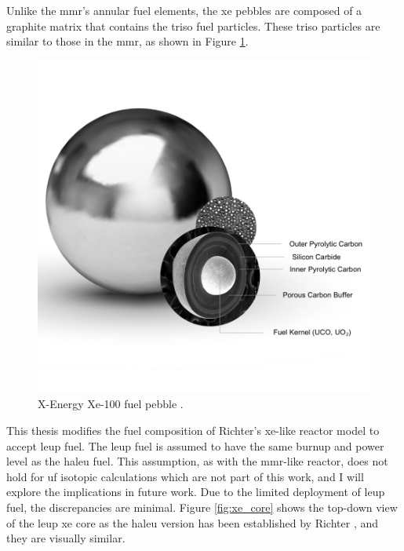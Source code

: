Unlike the \gls{mmr}'s annular fuel elements, the \gls{xe} pebbles are composed of a graphite matrix that contains the \gls{triso} fuel particles. These \gls{triso} particles are similar to those in the \gls{mmr}, as shown in Figure \ref{fig:xe_fuel}.

\begin{figure}[H]
    \centering
    \includegraphics[scale=0.28]{images/reactor_design/graphic-triso-x-pebble.jpg}
    \caption{X-Energy Xe-100 fuel pebble \cite{xe_fuel}.}
    \label{fig:xe_fuel}
\end{figure}


This thesis modifies the fuel composition of Richter's \gls{xe}-like reactor model to accept \gls{leup} fuel. The \gls{leup} fuel is assumed to have the same burnup and power level as the \gls{haleu} fuel. This assumption, as with the \gls{mmr}-like reactor, does not hold for \gls{uf} isotopic calculations which are not part of this work, and I will explore the implications in future work. Due to the limited deployment of \gls{leup} fuel, the discrepancies are minimal. Figure \ref{fig:xe_core} shows the top-down view of the \gls{leup} \gls{xe} core as the \gls{haleu} version has been established by Richter \cite{richter_thesis_2022}, and they are visually similar.


